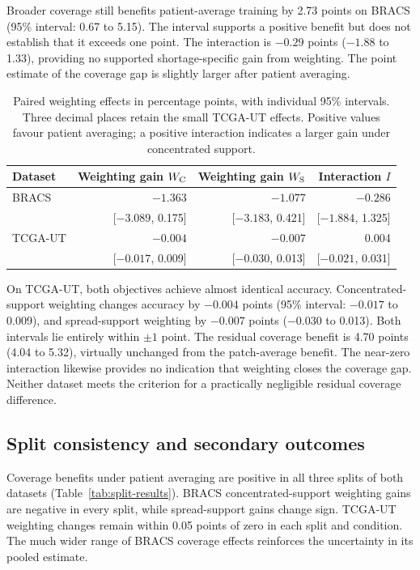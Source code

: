 \noindent Broader coverage still benefits patient-average training by 2.73 points on BRACS (95\% interval: 0.67 to 5.15). The interval supports a positive benefit but does not establish that it exceeds one point. The interaction is $-0.29$ points ($-1.88$ to 1.33), providing no supported shortage-specific gain from weighting. The point estimate of the coverage gap is slightly larger after patient averaging.

\begin{table}[htbp]
\centering\small
\setlength{\tabcolsep}{5pt}
\begin{tabular}{@{}lrrr@{}}
\toprule
Dataset & Weighting gain \(W_{\mathrm{C}}\) & Weighting gain \(W_{\mathrm{S}}\) & Interaction \(I\) \\
\midrule
BRACS & $-1.363$ & $-1.077$ & $-0.286$ \\
& [$-3.089$, 0.175] & [$-3.183$, 0.421] & [$-1.884$, 1.325] \\
TCGA-UT & $-0.004$ & $-0.007$ & 0.004 \\
& [$-0.017$, 0.009] & [$-0.030$, 0.013] & [$-0.021$, 0.031] \\
\bottomrule
\end{tabular}
\caption{Paired weighting effects in percentage points, with individual 95\% intervals. Three decimal places retain the small TCGA-UT effects. Positive values favour patient averaging; a positive interaction indicates a larger gain under concentrated support.}
\label{tab:weighting-results}
\end{table}

\noindent On TCGA-UT, both objectives achieve almost identical accuracy. Concentrated-support weighting changes accuracy by $-0.004$ points (95\% interval: $-0.017$ to 0.009), and spread-support weighting by $-0.007$ points ($-0.030$ to 0.013). Both intervals lie entirely within $\pm1$ point. The residual coverage benefit is 4.70 points (4.04 to 5.32), virtually unchanged from the patch-average benefit. The near-zero interaction likewise provides no indication that weighting closes the coverage gap. Neither dataset meets the criterion for a practically negligible residual coverage difference.

\subsection{Split consistency and secondary outcomes}
Coverage benefits under patient averaging are positive in all three splits of both datasets (Table~\ref{tab:split-results}). BRACS concentrated-support weighting gains are negative in every split, while spread-support gains change sign. TCGA-UT weighting changes remain within 0.05 points of zero in each split and condition. The much wider range of BRACS coverage effects reinforces the uncertainty in its pooled estimate.

